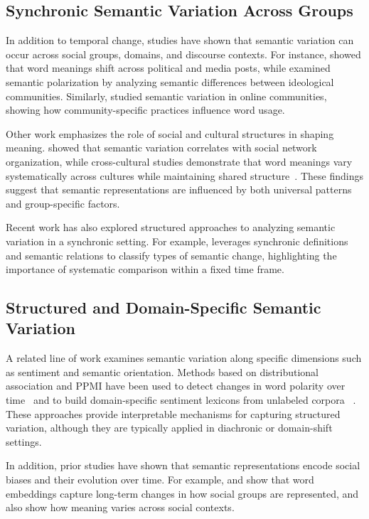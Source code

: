 \documentclass[11pt]{article}
\begin{document}
\subsection{Synchronic Semantic Variation Across Groups}

In addition to temporal change, studies have shown that semantic variation can occur across social groups, domains, and discourse contexts. For instance, \citet{azarbonyad2017words} showed that word meanings shift across political and media posts, while \citet{khudabukhsh2021we} examined semantic polarization by analyzing semantic differences between ideological communities. Similarly, \citet{del2017semantic} studied semantic variation in online communities, showing how community-specific practices influence word usage.

Other work emphasizes the role of social and cultural structures in shaping meaning. \citet{noble2021semantic} showed that semantic variation correlates with social network organization, while cross-cultural studies demonstrate that word meanings vary systematically across cultures while maintaining shared structure~\cite{jackson2019emotion, thompson2020cultural}. These findings suggest that semantic representations are influenced by both universal patterns and group-specific factors.

Recent work has also explored structured approaches to analyzing semantic variation in a synchronic setting. For example, \citet{cassotti2024using} leverages synchronic definitions and semantic relations to classify types of semantic change, highlighting the importance of systematic comparison within a fixed time frame.

\subsection{Structured and Domain-Specific Semantic Variation}

A related line of work examines semantic variation along specific dimensions such as sentiment and semantic orientation. Methods based on distributional association and PPMI have been used to detect changes in word polarity over time~\cite{cook2010automatically} and to build domain-specific sentiment lexicons from unlabeled corpora ~\cite{hamilton2016inducing}. These approaches provide interpretable mechanisms for capturing structured variation, although they are typically applied in diachronic or domain-shift settings.

In addition, prior studies have shown that semantic representations encode social biases and their evolution over time. For example, \citet{garg2018word} and \citet{charlesworth2022historical} show that word embeddings capture long-term changes in how social groups are represented, and also show how meaning varies across social contexts.
\end{document}
